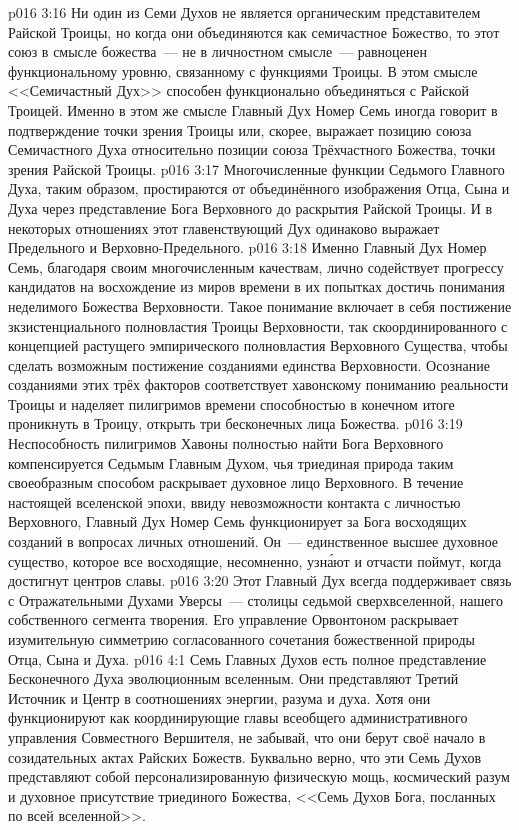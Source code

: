 \vs p016 3:16 Ни один из Семи Духов не является органическим представителем Райской Троицы, но когда они объединяются как семичастное Божество, то этот союз в смысле божества~--- не в личностном смысле~--- равноценен функциональному уровню, связанному с функциями Троицы. В этом смысле <<Семичастный Дух>> способен функционально объединяться с Райской Троицей. Именно в этом же смысле Главный Дух Номер Семь иногда говорит в подтверждение точки зрения Троицы или, скорее, выражает позицию союза Семичастного Духа относительно позиции союза Трёхчастного Божества, точки зрения Райской Троицы.
\vs p016 3:17 Многочисленные функции Седьмого Главного Духа, таким образом, простираются от объединённого изображения  Отца, Сына и Духа через представление  Бога Верховного до раскрытия  Райской Троицы. И в некоторых отношениях этот главенствующий Дух одинаково выражает  Предельного и Верховно\hyp{}Предельного.
\vs p016 3:18 Именно Главный Дух Номер Семь, благодаря своим многочисленным качествам, лично содействует прогрессу кандидатов на восхождение из миров времени в их попытках достичь понимания неделимого Божества Верховности. Такое понимание включает в себя постижение зкзистенциального полновластия Троицы Верховности, так скоординированного с концепцией растущего эмпирического полновластия Верховного Существа, чтобы сделать возможным постижение созданиями единства Верховности. Осознание созданиями этих трёх факторов соответствует хавонскому пониманию реальности Троицы и наделяет пилигримов времени способностью в конечном итоге проникнуть в Троицу, открыть три бесконечных лица Божества.
\vs p016 3:19 Неспособность пилигримов Хавоны полностью найти Бога Верховного компенсируется Седьмым Главным Духом, чья триединая природа таким своеобразным способом раскрывает духовное лицо Верховного. В течение настоящей вселенской эпохи, ввиду невозможности контакта с личностью Верховного, Главный Дух Номер Семь функционирует за Бога восходящих созданий в вопросах личных отношений. Он~--- единственное высшее духовное существо, которое все восходящие, несомненно, узн\'ают и отчасти поймут, когда достигнут центров славы.
\vs p016 3:20 Этот Главный Дух всегда поддерживает связь с Отражательными Духами Уверсы~--- столицы седьмой сверхвселенной, нашего собственного сегмента творения. Его управление Орвонтоном раскрывает изумительную симметрию согласованного сочетания божественной природы Отца, Сына и Духа.
\vs p016 4:1 Семь Главных Духов есть полное представление Бесконечного Духа эволюционным вселенным. Они представляют Третий Источник и Центр в соотношениях энергии, разума и духа. Хотя они функционируют как координирующие главы всеобщего административного управления Совместного Вершителя, не забывай, что они берут своё начало в созидательных актах Райских Божеств. Буквально верно, что эти Семь Духов представляют собой персонализированную физическую мощь, космический разум и духовное присутствие триединого Божества, <<Семь Духов Бога, посланных по всей вселенной>>.
